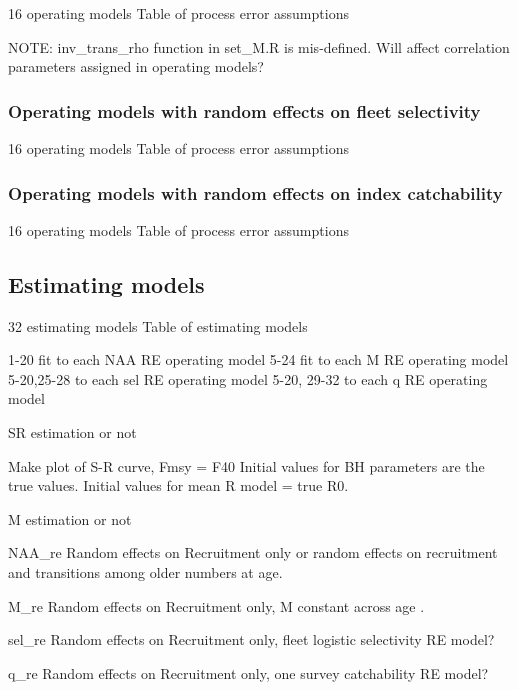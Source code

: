 \documentclass[
  12pt,
]{article}
\begin{document}
16 operating models Table of process error assumptions

NOTE: inv\_trans\_rho function in set\_M.R is mis-defined. Will affect
correlation parameters assigned in operating models?

\hypertarget{operating-models-with-random-effects-on-fleet-selectivity}{%
\subsubsection{Operating models with random effects on fleet
selectivity}\label{operating-models-with-random-effects-on-fleet-selectivity}}

16 operating models Table of process error assumptions

\hypertarget{operating-models-with-random-effects-on-index-catchability}{%
\subsubsection{Operating models with random effects on index
catchability}\label{operating-models-with-random-effects-on-index-catchability}}

16 operating models Table of process error assumptions

\hypertarget{estimating-models}{%
\subsection{Estimating models}\label{estimating-models}}

32 estimating models Table of estimating models

1-20 fit to each NAA RE operating model 5-24 fit to each M RE operating
model 5-20,25-28 to each sel RE operating model 5-20, 29-32 to each q RE
operating model

SR estimation or not

Make plot of S-R curve, Fmsy = F40 Initial values for BH parameters are
the true values. Initial values for mean R model = true R0.

M estimation or not

NAA\_re Random effects on Recruitment only or random effects on
recruitment and transitions among older numbers at age.

M\_re Random effects on Recruitment only, M constant across age .

sel\_re Random effects on Recruitment only, fleet logistic selectivity
RE model?

q\_re Random effects on Recruitment only, one survey catchability RE
model?
\end{document}
